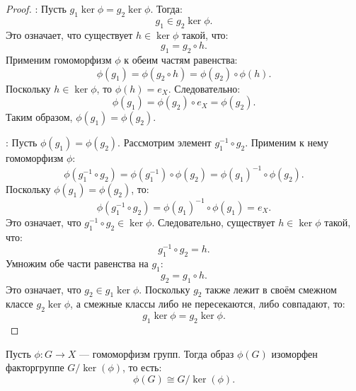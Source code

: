 \begin{proof}
\leavevmode \nl 

    \boxed{\Longrightarrow}: Пусть \( g_1 \ker \phi = g_2 \ker \phi \). Тогда:
          \[
          g_1 \in g_2 \ker \phi.
          \]
          Это означает, что существует \( h \in \ker \phi \) такой, что:
          \[
          g_1 = g_2 \circ h.
          \]
          Применим гомоморфизм \( \phi \) к обеим частям равенства:
          \[
          \phi(g_1) = \phi(g_2 \circ h) = \phi(g_2) \circ \phi(h).
          \]
          Поскольку \( h \in \ker \phi \), то \( \phi(h) = e_X \). Следовательно:
          \[
          \phi(g_1) = \phi(g_2) \circ e_X = \phi(g_2).
          \]
          Таким образом, \( \phi(g_1) = \phi(g_2) \).

    \boxed{\Longleftarrow}: Пусть \( \phi(g_1) = \phi(g_2) \). Рассмотрим элемент \( g_1^{-1} \circ g_2 \). Применим к нему \\гомоморфизм \( \phi \):
          \[
          \phi(g_1^{-1} \circ g_2) = \phi(g_1^{-1}) \circ \phi(g_2) = \phi(g_1)^{-1} \circ \phi(g_2).
          \]
          Поскольку \( \phi(g_1) = \phi(g_2) \), то:
          \[
          \phi(g_1^{-1} \circ g_2) = \phi(g_1)^{-1} \circ \phi(g_1) = e_X.
          \]
          Это означает, что \( g_1^{-1} \circ g_2 \in \ker \phi \). Следовательно, существует \( h \in \ker \phi \) такой, что:
          \[
          g_1^{-1} \circ g_2 = h.
          \]
          Умножим обе части равенства на \( g_1 \):
          \[
          g_2 = g_1 \circ h.
          \]
          Это означает, что \( g_2 \in g_1 \ker \phi \). Поскольку \( g_2 \) также лежит в своём смежном классе \( g_2 \ker \phi \), а смежные классы либо не пересекаются, либо совпадают, то:
          \[
          g_1 \ker \phi = g_2 \ker \phi.
          \]
\end{proof}

\begin{shth}
    \begin{theorem}
    \leavevmode \nl 
    
        Пусть \( \phi: G \to X \) — гомоморфизм групп. Тогда образ \( \phi(G) \) изоморфен факторгруппе \( G / \ker(\phi) \), то есть:
        \[
        \phi(G) \cong G / \ker(\phi).
        \]
    \end{theorem}
\end{shth}


